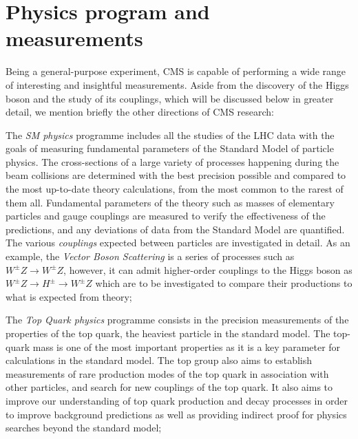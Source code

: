 \section{Physics program and measurements}

Being a general-purpose experiment, CMS is capable of performing a wide range of interesting and insightful measurements. Aside from the discovery of the Higgs boson and the study of its couplings, which will be discussed below in greater detail, we mention briefly the other directions of CMS research:

\begin{outline}
    \1 The \emph{SM physics} programme includes all the studies of the LHC data with the goals of measuring fundamental parameters of the Standard Model of particle physics. The cross-sections of a large variety of processes happening during the beam collisions are determined with the best precision possible and compared to the most up-to-date theory calculations, from the most common to the rarest of them all. Fundamental parameters of the theory such as masses of elementary particles and gauge couplings are measured to verify the effectiveness of the predictions, and any deviations of data from the Standard Model are quantified. The various \emph{couplings} expected between particles are investigated in detail. As an example, the \emph{Vector Boson Scattering} is a series of processes such as $W^{\pm} Z \rightarrow W^{\pm} Z$, however, it can admit higher-order couplings to the Higgs boson as $W^{\pm} Z \rightarrow H^{\pm} \rightarrow W^{\pm} Z$ which are to be investigated to compare their productions to what is expected from theory;
    
    \1 The \emph{Top Quark physics} programme consists in the precision measurements of the properties of the top quark, the heaviest particle in the standard model. The top-quark mass is one of the most important properties as it is a key parameter for calculations in the standard model. The top group also aims to establish measurements of rare production modes of the top quark in association with other particles, and search for new couplings of the top quark. It also aims to improve our understanding of top quark production and decay processes in order to improve background predictions as well as providing indirect proof for physics searches beyond the standard model;
    

\end{outline}
